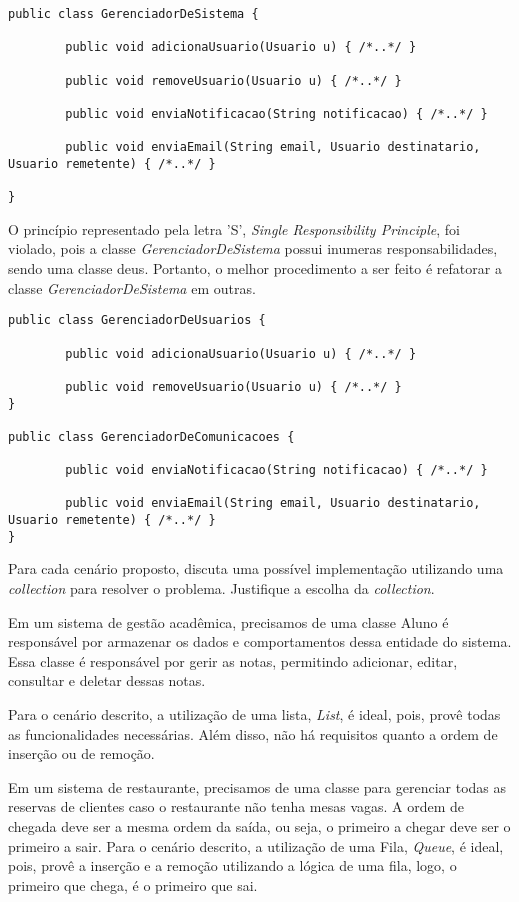 \documentclass{lib/eng_softdoc}
\begin{document}
\subproblem
\begin{lstlisting}
public class GerenciadorDeSistema {

        public void adicionaUsuario(Usuario u) { /*..*/ }

        public void removeUsuario(Usuario u) { /*..*/ }

        public void enviaNotificacao(String notificacao) { /*..*/ }

        public void enviaEmail(String email, Usuario destinatario, Usuario remetente) { /*..*/ }

} 
\end{lstlisting}
\answer O princípio representado pela letra 'S', \textit{Single Responsibility Principle}, 
foi violado, pois a classe \textit{GerenciadorDeSistema} possui inumeras responsabilidades, sendo uma classe deus.
Portanto, o melhor procedimento a ser feito é refatorar a classe \textit{GerenciadorDeSistema} em outras.
\begin{lstlisting}
public class GerenciadorDeUsuarios {

        public void adicionaUsuario(Usuario u) { /*..*/ }

        public void removeUsuario(Usuario u) { /*..*/ }
} 

public class GerenciadorDeComunicacoes {

        public void enviaNotificacao(String notificacao) { /*..*/ }

        public void enviaEmail(String email, Usuario destinatario, Usuario remetente) { /*..*/ }
} 
\end{lstlisting}
\vspace{0.5cm}

\problem Para cada cenário proposto, discuta uma possível implementação utilizando uma \textit{collection} para resolver o problema.
Justifique a escolha da \textit{collection}.

\vspace{0.5cm}
\subproblem Em um sistema de gestão acadêmica, precisamos de uma classe Aluno é responsável por armazenar os dados
e comportamentos dessa entidade do sistema. Essa classe é responsável por gerir as notas, permitindo adicionar, editar, consultar
e deletar dessas notas.

\answer Para o cenário descrito, a utilização de uma lista, \textit{List}, é ideal, pois, provê todas as funcionalidades
necessárias. Além disso, não há requisitos quanto a ordem de inserção ou de remoção.

\vspace{0.5cm}
\vspace{1.0cm}
\subproblem Em um sistema de restaurante, precisamos de uma classe para gerenciar todas as reservas de clientes caso o restaurante
não tenha mesas vagas. A ordem de chegada deve ser a mesma ordem da saída, ou seja, o primeiro a chegar deve ser o primeiro
a sair. \answer Para o cenário descrito, a utilização de uma Fila, \textit{Queue}, é ideal, pois, provê a inserção e a remoção
utilizando a lógica de uma fila, logo, o primeiro que chega, é o primeiro que sai.
\end{document}
